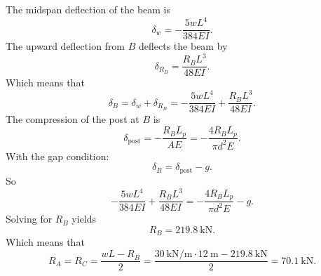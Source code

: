 \begin{derivation}
  The midspan deflection of the beam is
  \begin{equation*}
    \delta_{w} =- \frac{5w L^{4}}{384EI}
  .\end{equation*}
  The upward deflection from $B$ deflects the beam by
  \begin{equation*}
    \delta_{R_B} = \frac{R_B L^3}{48EI}
  .\end{equation*}
  Which means that
  \begin{equation*}
    \delta_B = \delta_w + \delta_{R_B} = - \frac{5 wL^{4}}{384EI} + \frac{R_B L^3}{48EI}
  .\end{equation*}
  The compression of the post at $B$ is
  \begin{equation*}
    \delta_{\mathrm{post}} = - \frac{R_B L_p}{AE} = - \frac{4R_B L_p}{\pi d^2 E}
  .\end{equation*}
  With the gap condition:
  \begin{equation*}
    \delta_B = \delta_{\mathrm{post}} - g
  .\end{equation*}
  So
  \begin{equation*}
    - \frac{5 wL^{4}}{384EI} + \frac{R_B L^3}{48EI} = - \frac{4 R_B L_p}{\pi d^2 E} - g
  .\end{equation*}
  Solving for $R_B$ yields
  \begin{equation*}
    R_B = \qty{219,8}{\kN}
  .\end{equation*}
  Which means that
  \begin{equation*}
    R_A = R_C = \frac{w L - R_B}{2} = \frac{\qty{30}{\kN\per\m} \cdot \qty{12}{\m} - \qty{219.8}{\kN}}{2} = \qty{70,1}{\kN}
  .\end{equation*}
\end{derivation}

